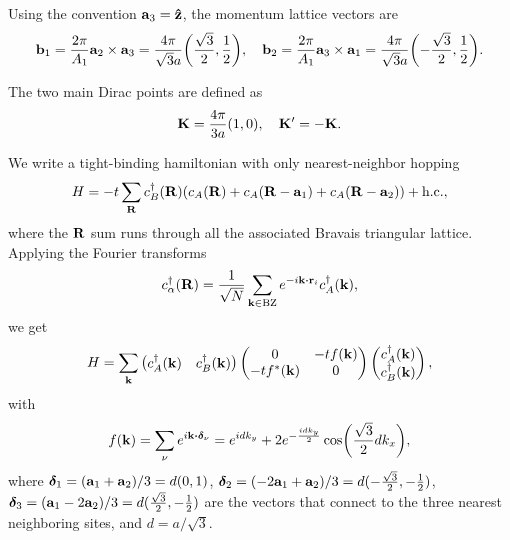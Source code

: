 Using the convention ${\vb{a}}_3 = \vu{z}$, the momentum lattice vectors are
\begin{equation} \label{eq:monolayer-bvecs}
{\vb{b}}_1 = \frac{2\pi}{A_1} {\vb{a}}_2 \times {\vb{a}}_3 = \frac{4\pi}{\sqrt{3} a } \qty(\frac{\sqrt{3}}{2}, \frac{1}{2}), \quad
{\vb{b}}_2 = \frac{2\pi}{A_1} {\vb{a}}_3 \times {\vb{a}}_1 = \frac{4\pi}{\sqrt{3} a } \qty(-\frac{\sqrt{3}}{2}, \frac{1}{2}).
\end{equation}

The two main Dirac points are defined as
\begin{equation} \label{eq:monolayer-dirac-points}
{\vb{K}} = \frac{4\pi}{3a} (1, 0) , \quad {\vb{K}}' = -{\vb{K}}.
\end{equation}



We write a tight-binding hamiltonian with only nearest-neighbor hopping
\begin{equation} \label{eq:monolayer-tight-binding}
H = -t \sum_{{\vb{R}}} c^{\dagger}_B({\vb{R}}) \qty(c_A({\vb{R}}) + c_A({\vb{R}}-{\vb{a}}_1) + c_A({\vb{R}}-{\vb{a}}_2)) + {\text{h.c.}},
\end{equation}
where the ${\vb{R}}$ sum runs through all the associated Bravais triangular lattice. Applying the Fourier transforms
\begin{equation} \label{eq:monolayer-fourier}
c_{\alpha}^\d(\R) = \frac{1}{\sqrt{N}} \sum_{\k \in \text{BZ}} e^{-i \k \vdot \r_i} c_A^\d(\k),
\end{equation}
we get
\begin{equation} \label{eq:monolayer-tight-binding2}
H = \sum_{{\vb{k}}}
\begin{pmatrix}
c_A^{\dagger}({\vb{k}}) & c_B^{\dagger}({\vb{k}})
\end{pmatrix}
\begin{pmatrix}
0 & -t f({\vb{k}}) \\
-t f^*({\vb{k}}) & 0
\end{pmatrix}
\begin{pmatrix}
c_A^{\dagger}({\vb{k}}) \\ c_B^{\dagger}({\vb{k}})
\end{pmatrix},
\end{equation}
with
\begin{equation} \label{eq:monolayer-fk}
f(\k) = \sum_{\nu} e^{i \k \vdot \bm{\delta}_\nu} =
e^{idk_y} + 2 e^{-\frac{idk_y}{2}} \cos(\frac{\sqrt{3}}{2} dk_x),
\end{equation}
where $\bm{\delta}_1 = ({\vb{a}}_1 + {\vb{a}}_2)/3 = d (0, 1)$, $\bm{\delta}_2 = (-2{\vb{a}}_1 + {\vb{a}}_2)/3 = d(-\frac{\sqrt{3}}{2}, -\frac{1}{2})$, $\bm{\delta}_3 = ({\vb{a}}_1 - 2{\vb{a}}_2)/3 = d (\frac{\sqrt{3}}{2}, -\frac{1}{2})$ are the vectors that connect to the three nearest neighboring sites, and $d = a/\sqrt{3}$.

